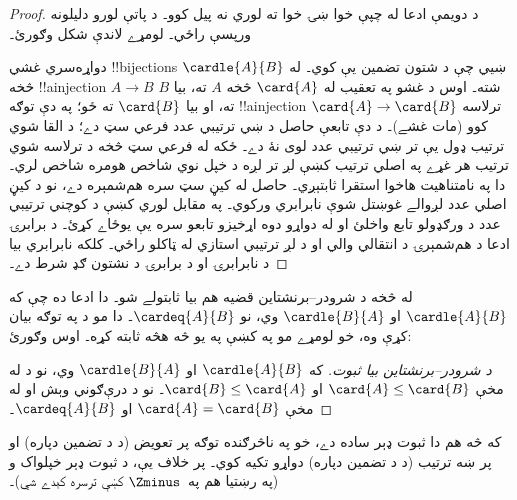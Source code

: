 \documentclass[../../../include/open-logic-section]{subfiles}
\begin{document}
\begin{proof}
د دويمې ادعا له چپې خوا ښۍ خوا ته لوري نه پيل کوو۔
د پاتې لورو دليلونه ورپسې راځي۔ لومړے لاندې شکل وګورئ۔
\begin{center}
\end{center}
دواړه‌سري غشي !!{bijection}s ښيي چې د شتون تضمين يې
 کوي۔ له $\cardle{A}{B}$ څخه
!!a{injection} $A\to B$ شته۔ اوس د غشو په تعقيب له $\card{A}$
څخه $A$ ته، بيا $B$ ته، او بيا $\card{B}$ ته ځو؛ په دې توګه
!!a{injection} $\card{A} \to \card{B}$ ترلاسه کوو (مات غشے)۔
د دې تابعې حاصل د ښي ترتيبي عدد فرعي سټ دے؛ د القا شوي
ترتيب ډول يې تر ښي ترتيبي عدد لوی نۀ دے۔ ځکه له فرعي سټ
څخه د ترلاسه شوي ترتيب هر غړے په اصلي ترتيب کښې لږ تر لږه
د خپل نوي شاخص هومره شاخص لري۔ دا په نامتناهيت هاخوا استقرا
ثابتېږي۔ حاصل له کيڼ سټ سره هم‌شمېره دے، نو د کيڼ اصلي
عدد لږوالے غوښتل شوې نابرابري ورکوي۔ په مقابل لوري کښې
د کوچني ترتيبي عدد د ورګډولو تابع واخلئ او له دواړو
دوه اړخيزو تابعو سره يې يوځاے کړئ۔ د برابرۍ ادعا د
هم‌شمېرۍ د انتقالي والي او د لږ ترتيبي استازي له ټاکلو راځي۔
کلکه نابرابري بيا د نابرابرۍ او د برابرۍ د نشتون ګډ شرط دے۔
\end{proof}\noindent له  څخه د
شرودر--برنشتاين قضيه هم بيا ثابتولے شو۔ دا ادعا ده چې که
$\cardle{A}{B}$ او $\cardle{B}{A}$ وي، نو $\cardeq{A}{B}$۔
دا مو د  په توګه
بيان کړې وه، خو لومړے مو په 
کښې په يو څه هڅه ثابته کړه۔ اوس وګورئ:

\begin{proof}[د شرودر--برنشتاين بيا ثبوت]
که $\cardle{A}{B}$ او $\cardle{B}{A}$ وي، نو د
 له مخې $\card{A} \leq \card{B}$
او $\card{B} \leq \card{A}$۔ نو د درې‌ګوني وېش او
 له مخې $\card{A} = \card{B}$
او $\cardeq{A}{B}$۔
\end{proof}
\noindent
که څه هم دا ثبوت ډېر ساده دے، خو په ناڅرګنده توګه پر تعويض
(د  د تضمين
دپاره) او پر ښه ترتيب (د  د
تضمين دپاره) دواړو تکيه کوي۔ پر خلاف يې، د
 ثبوت ډېر خپلواک و (په رښتيا
هم په~$\Zminus$ کښې ترسره کېدے شي)۔
\end{document}
